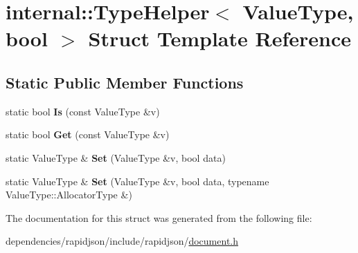 \hypertarget{structinternal_1_1_type_helper_3_01_value_type_00_01bool_01_4}{}\section{internal\+:\+:Type\+Helper$<$ Value\+Type, bool $>$ Struct Template Reference}
\label{structinternal_1_1_type_helper_3_01_value_type_00_01bool_01_4}
\subsection*{Static Public Member Functions}
\begin{DoxyCompactItemize}
\item 
\mbox{\label{structinternal_1_1_type_helper_3_01_value_type_00_01bool_01_4_aa73fb8b4ed649706f7f9165401f89c27}} 
static bool {\bfseries Is} (const Value\+Type \&v)
\item 
\mbox{\label{structinternal_1_1_type_helper_3_01_value_type_00_01bool_01_4_aed612b233e5985d049248b414fb0034a}} 
static bool {\bfseries Get} (const Value\+Type \&v)
\item 
\mbox{\label{structinternal_1_1_type_helper_3_01_value_type_00_01bool_01_4_a4bfa644e57e7d725468ed78103c1579a}} 
static Value\+Type \& {\bfseries Set} (Value\+Type \&v, bool data)
\item 
\mbox{\label{structinternal_1_1_type_helper_3_01_value_type_00_01bool_01_4_a01a2bdf4117fb767c8d703be9e0f5f1d}} 
static Value\+Type \& {\bfseries Set} (Value\+Type \&v, bool data, typename Value\+Type\+::\+Allocator\+Type \&)
\end{DoxyCompactItemize}


The documentation for this struct was generated from the following file\+:\begin{DoxyCompactItemize}
\item 
dependencies/rapidjson/include/rapidjson/\hyperlink{document_8h}{document.\+h}\end{DoxyCompactItemize}
